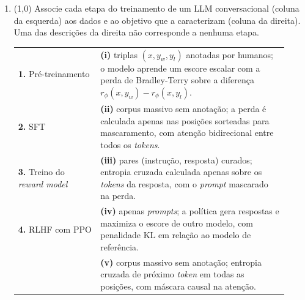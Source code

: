 \documentclass[11pt,a4paper]{article}
\begin{document}
\begin{enumerate}[1)]
Usando a estimativa por amostra do termo KL, qual resposta tem o maior valor do objetivo do RLHF, e qual é esse valor?

\begin{enumerate}[a)]
    \item Resposta B, com objetivo $3.5$.
    \item Resposta B, com objetivo $5.5$.
    \item Resposta A, com objetivo $1.8$.
    \item Resposta D, com objetivo $2.1$.
    \item Resposta C, com objetivo $1.3$.
    \item Resposta D, com objetivo $1.6$.
    \item Resposta D, com objetivo $3.1$.
    \item Resposta B, com objetivo $1.5$.
\end{enumerate}

\pagebreak
\item (1{,}0) Associe cada etapa do treinamento de um LLM conversacional (coluna da esquerda) aos dados e ao objetivo que a caracterizam (coluna da direita). Uma das descrições da direita não corresponde a nenhuma etapa.

\begin{center}
\begin{tabular}{p{0.28\linewidth} p{0.64\linewidth}}
\textbf{1.} Pré-treinamento & \textbf{(i)} triplas $(x, y_w, y_l)$ anotadas por humanos; o modelo aprende um escore escalar com a perda de Bradley-Terry sobre a diferença $r_\phi(x, y_w) - r_\phi(x, y_l)$. \\
\textbf{2.} SFT & \textbf{(ii)} corpus massivo sem anotação; a perda é calculada apenas nas posições sorteadas para mascaramento, com atenção bidirecional entre todos os \textit{tokens}. \\
\textbf{3.} Treino do \textit{reward model} & \textbf{(iii)} pares (instrução, resposta) curados; entropia cruzada calculada apenas sobre os \textit{tokens} da resposta, com o \textit{prompt} mascarado na perda. \\
\textbf{4.} RLHF com PPO & \textbf{(iv)} apenas \textit{prompts}; a política gera respostas e maximiza o escore de outro modelo, com penalidade KL em relação ao modelo de referência. \\
 & \textbf{(v)} corpus massivo sem anotação; entropia cruzada de próximo \textit{token} em todas as posições, com máscara causal na atenção. \\
\end{tabular}
\end{center}


\end{enumerate}
\end{document}
